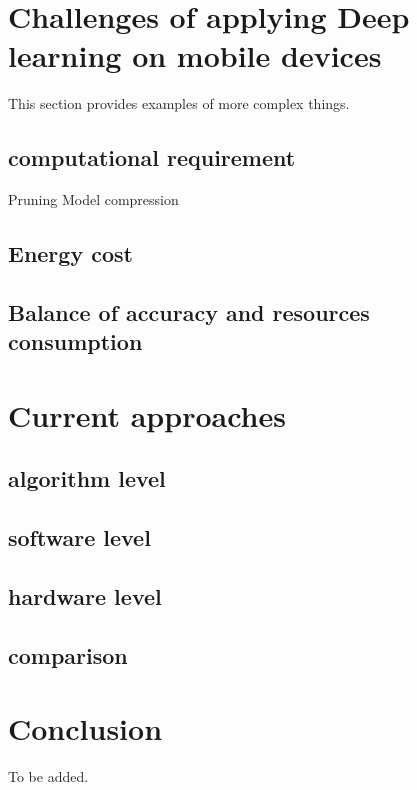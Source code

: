\documentclass[article]{aaltoseries}
\begin{document}





\section{Challenges of applying Deep learning on mobile devices}

This section provides examples of more complex things.




\subsection{computational requirement}
Pruning
Model compression

\subsection{Energy cost}

\subsection{Balance of accuracy and resources consumption}







\section{Current approaches}

\subsection{algorithm level}

\subsection{software level}

\subsection{hardware level}

\subsection{comparison}






\section{Conclusion}

To be added.






\end{document}
